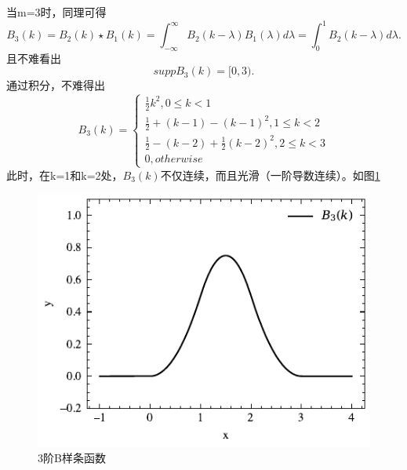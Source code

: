 当m=3时，同理可得
\begin{equation*}
    B_{3}(k)=B_{2}(k)\star B_{1}(k)=\int_{-\infty}^{\infty}B_{2}(k-\lambda)B_{1}(\lambda)d\lambda=
\int_{0}^{1}B_{2}(k-\lambda)d\lambda .
\end{equation*}
且不难看出
\begin{equation}
    supp B_3(k)=[0,3).
\end{equation}
通过积分，不难得出
\begin{equation}
B_3(k)=
    \left\{\begin{matrix} 
\frac{1}{2}k^2 ,0\le k<1\\
\frac{1}{2}+(k-1)-(k-1)^2 ,1\le k<2\\
\frac{1}{2}-(k-2)+\frac{1}{2} (k-2)^2 ,2\le k<3\\
0,otherwise
\end{matrix}\right. 
\end{equation}
此时，在k=1和k=2处，$B_3(k)$不仅连续，而且光滑（一阶导数连续）。如图\ref{B3}
\begin{figure}[htbp]
    \centering
    \includegraphics[width=0.76\linewidth]{figures/B-splin/B3.pdf}
    \caption{3阶B样条函数}
    \label{B3}
\end{figure}

